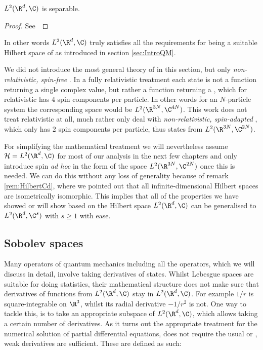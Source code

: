 \begin{prop}
	$L^2(\R^d, \C)$ is separable.
	\begin{proof}
		See~\cite{Werner2011}
	\end{proof}
\end{prop}
In other words $L^2(\R^d, \C)$ truly satisfies all the requirements
for being a suitable Hilbert space of \QM
as introduced in section \vref{sec:IntroQM}.

\begin{rem}
We did not introduce the most general theory of \QM
in this section, but only  \emph{non-relativistic, spin-free} \QM.
In a fully relativistic \QM treatment
each state is not a function returning
a single complex value, but rather a function returning a ,
which for relativistic \QM has $4$ spin components per particle.
In other words for an $N$-particle system
the corresponding space would be $L^2(\R^{3N}, \C^{4N})$.
This work does not treat relativistic \QM at all,
much rather only deal with \textit{non-relativistic, spin-adapted} \QM,
which only has $2$ spin components per particle,
thus states from $L^2(\R^{3N}, \C^{2N})$.

For simplifying the mathematical treatment we will nevertheless
assume $\hilbert = L^2(\R^d, \C)$ for most of our analysis
in the next few chapters and only introduce spin \textit{ad hoc} in the form
of the space $L^2(\R^{3N}, \C^{2N})$ once this is needed.
We can do this without any loss of generality
because of remark \vref{rem:HilbertCd},
where we pointed out that all infinite-dimensional
Hilbert spaces are isometrically isomorphic.
This implies that all of the properties we have showed or will show based
on the Hilbert space $L^2(\R^d, \C)$ can be generalised
to $L^2(\R^d, \C^s)$ with $s \geq 1$ with ease.
\end{rem}

\subsection{Sobolev spaces}
\label{sec:Sobolev}
Many operators of quantum mechanics including all the operators,
which we will discuss in detail, involve taking derivatives of states.
Whilst Lebesgue spaces are suitable for doing statistics,
their mathematical structure does not make sure
that derivatives of functions from $L^2(\R^d, \C)$ stay in $L^2(\R^d, \C)$.
For example $1/r$ is square-integrable on $\R^3$,
whilst its radial derivative $-1/r^2$ is not.
One way to tackle this, is to take an appropriate subspace of $L^2(\R^d, \C)$,
which allows taking a certain number of derivatives.
As it turns out the appropriate treatment for the numerical solution
of partial differential equations,
does not require the usual or ,
weak derivatives are sufficient.
These are defined as such:

